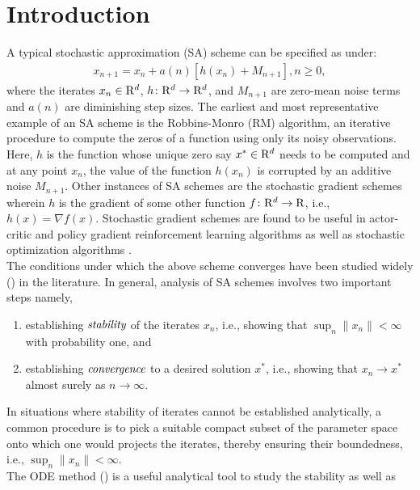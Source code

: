 \section{Introduction}
A typical stochastic approximation \cite{kushner} (SA) scheme can be specified as under:
\begin{align}\label{rmsa}
x_{n+1}=x_n+a(n)[h(x_n)+M_{n+1}], n\geq 0,
\end{align}
where the iterates $x_n \in \mathrm{R}^d$, $h\colon \mathrm{R}^d \rightarrow \mathrm{R}^d$, and $M_{n+1}$ are zero-mean noise terms and $a(n)$ are diminishing step sizes. The earliest and most representative example of an SA scheme is the 
Robbins-Monro (RM) algorithm, an iterative procedure to compute the zeros of a function using only 
its noisy observations. Here, $h$ is the function whose unique zero say $x^* \in \mathrm{R}^d$ needs to be 
computed and at any point $x_n$, the value of the function $h(x_n)$ is corrupted by an additive noise 
$M_{n+1}$. Other instances of SA schemes are the stochastic gradient schemes wherein $h$ is the 
gradient of some other function $f\colon \mathrm{R}^d \rightarrow \mathrm{R}$, i.e., $h(x)=\nabla f(x)$. Stochastic gradient 
schemes are found to be useful in actor-critic \cite{NAC,IAC,KAC,BAC,BSPSA,Pet-Sch,ALP-Bor,SB1} and policy gradient \cite{Bax-Bar,Amari,SMSM,Kak,SP} reinforcement learning algorithms as well as stochastic optimization algorithms \cite{SPSA,TTSPSA,SB-VB,Mar-Tsit,SB-VB2,SB3,BTS,BO,BADA}.\\
\indent The conditions under which the above scheme converges have been studied widely (\cite{kushner,SA}) 
in the literature. In general, analysis of SA schemes involves two important steps namely,
\begin{enumerate}
\item establishing $\emph{stability}$ of the iterates $x_n$, i.e., showing that 
$\sup_n \parallel x_n\parallel <\infty$ with probability one, and  \label{stb}
\item establishing $\emph{convergence}$ to a desired solution $x^*$, i.e., showing that 
$x_n \rightarrow x^*$ almost surely as $n \rightarrow \infty$. \label{conv}
\end{enumerate}
In situations where stability of iterates cannot be established analytically, a common procedure 
is to pick a suitable compact subset of the parameter space onto which one would projects the iterates, 
thereby ensuring their boundedness, i.e., $\sup_n \parallel x_n\parallel <\infty$.\\
\indent The ODE method (\cite{SA,BMSTAB}) is a useful analytical tool to study the stability as well as 
